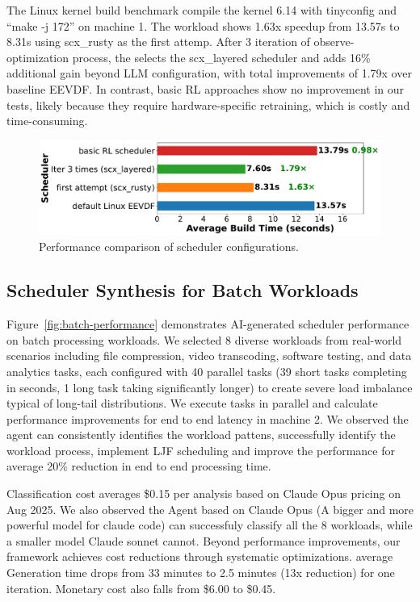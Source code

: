 
The Linux kernel build benchmark compile the kernel 6.14 with tinyconfig and ``make -j 172'' on machine 1. The workload shows 1.63x speedup from 13.57s to 8.31s using scx\_rusty as the first attemp. After 3 iteration of observe-optimization process, the \agent selects the scx\_layered scheduler and adds 16\% additional gain beyond LLM configuration, with total improvements of 1.79x over baseline EEVDF. In contrast, basic RL approaches show no improvement in our tests, likely because they require hardware-specific retraining, which is costly and time-consuming. 

\begin{figure}[h]
\centering
\includegraphics[width=0.9\columnwidth]{sections/Linux_build_benchmark_results.pdf}
\caption{Performance comparison of scheduler configurations.}
\label{fig:performance-comparison}
\end{figure}

\subsection{Scheduler Synthesis for Batch Workloads}

Figure~\ref{fig:batch-performance} demonstrates AI-generated scheduler performance on batch processing workloads. We selected 8 diverse workloads from real-world scenarios including file compression, video transcoding, software testing, and data analytics tasks, each configured with 40 parallel tasks (39 short tasks completing in seconds, 1 long task taking significantly longer) to create severe load imbalance typical of long-tail distributions. We execute tasks in parallel and calculate performance improvements for end to end latency in machine 2. We observed the agent can consistently identifies the workload pattens, successfully identify the workload process, implement LJF scheduling and improve the performance for average 20\% reduction in end to end processing time.

Classification cost averages \$0.15 per analysis based on Claude Opus pricing on Aug 2025. We also observed the Agent based on Claude Opus (A bigger and more powerful model for claude code) can successfuly classify all the 8 workloads, while a smaller model Claude sonnet cannot. Beyond performance improvements, our framework achieves cost reductions through systematic optimizations. average Generation time drops from 33 minutes to 2.5 minutes (13x reduction) for one iteration. Monetary cost also falls from \$6.00 to \$0.45.

